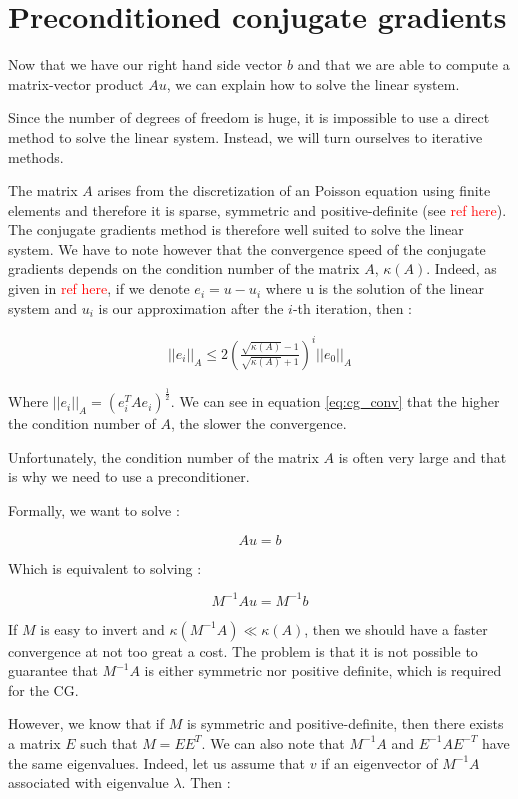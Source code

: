 \section{Preconditioned conjugate gradients}

Now that we have our right hand side vector $b$ and that we are able to compute a matrix-vector product $Au$, we can explain how to solve the linear system. 

Since the number of degrees of freedom is huge, it is impossible to use a direct method to solve the linear system. Instead, we will turn ourselves to iterative methods. 

The matrix $A$ arises from the discretization of an Poisson equation using finite elements and therefore it is sparse, symmetric and positive-definite (see \textcolor{red}{ref here}). The conjugate gradients method is therefore well suited to solve the linear system. We have to note however that the convergence speed of the conjugate gradients depends on the condition number of the matrix $A$, $\kappa(A)$. Indeed, as given in \textcolor{red}{ref here}, if we denote $e_i = u-u_i$ where u is the solution of the linear system and $u_i$ is our approximation after the $i$-th iteration, then : 

\begin{align}
||e_i||_A \leq 2 \left(\frac{\sqrt{\kappa(A)}-1}{\sqrt{\kappa(A)}+1}\right)^i ||e_0||_A \label{eq:cg_conv}
\end{align}


Where $||e_i||_A = \left(e_i^TAe_i\right)^\frac{1}{2}$. We can see in equation \ref{eq:cg_conv} that the higher the condition number of $A$, the slower the convergence.  

Unfortunately, the condition number of the matrix $A$ is often very large and that is why we need to use a preconditioner. 

Formally, we want to solve : 

$$Au=b$$

Which is equivalent to solving : 

$$M^{-1}A u = M^{-1}b$$

If $M$ is easy to invert and $\kappa(M^{-1}A) \ll \kappa(A)$, then we should have a faster convergence at not too great a cost. The problem is that it is not possible to guarantee that $M^{-1}A$ is either symmetric nor positive definite, which is required for the CG.

However, we know that if $M$ is symmetric and positive-definite, then there exists a matrix $E$ such that $M = EE^T$. We can also note that $M^{-1}A$ and $E^{-1}AE^{-T}$ have the same eigenvalues. Indeed, let us assume that $v$ if an eigenvector of $M^{-1}A$ associated with eigenvalue $\lambda$. Then :


